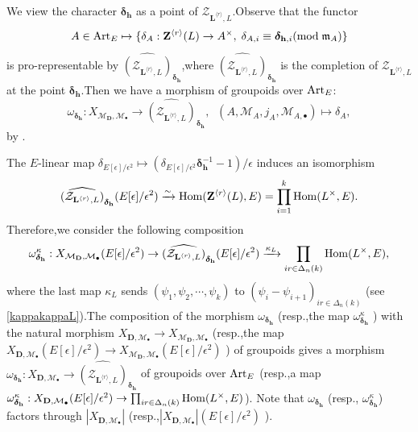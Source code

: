 \documentclass[SecEq,CM,GP]{degruyter-crelle} %
\theoremstyle{plain}
\newcommand{\Art}{{\rm Art}}
\newcommand{\Dpik}{{\mathbf{D}}}
\newcommand{\homo}{{\rm Hom}}
\newcommand{\lrr}{{\langle r\rangle}}
\newcommand{\bL}{{\mathbf{L}}}
\newcommand{\bZ}{{\mathbf{Z}}}
\newcommand{\bh}{{\mathbf{h}}}
\newcommand{\cM}{\mathcal M}
\newcommand{\cZ}{\mathcal Z}
\begin{document}
We view the character $\bm{\delta}_{\bh}$ as a point of $\cZ_{\bL^{\lrr},L}$.\;Observe that the functor
\[A\in \Art_E\mapsto \{\delta_A:\bZ^{\lrr}(L)\rightarrow A^\times,\;{\delta}_{A,i}\equiv \bm{\delta}_{\bh,i}(\mathrm{mod}\;\mathfrak{m}_A)\}\]
is pro-representable by $\widehat{(\cZ_{\bL^{\lrr},L})}_{\bm{\delta}_{\bh}}$,\;where $\widehat{(\cZ_{\bL^{\lrr},L})}_{\bm{\delta}_{\bh}}$ is the completion of $\cZ_{\bL^{\lrr},L}$ at the point $\bm{\delta}_{\bh}$.\;Then we have a morphism  of groupoids over $\Art_E$:
\begin{equation}\label{omegadeltapinon}
\omega_{\bm{\delta}_{\bh}}:X_{\cM_\Dpik,\cM_{\bullet}}\rightarrow \widehat{(\cZ_{\bL^{\lrr},L})}_{\bm{\delta}_{\bh}},\;\;(A,\cM_A,j_A,\cM_{A,\bullet})\mapsto \delta_A,
\end{equation}
by \cite[Lemma 6.2.2]{Ding2021}.\;

The $E$-linear map $\delta_{E[\epsilon]/\epsilon^2}\mapsto (\delta_{E[\epsilon]/\epsilon^2}\bm{\delta}_{\bh}^{-1}-1)/\epsilon$ induces an isomorphism $$\widehat{(\cZ_{\bL^{\lrr},L})}_{\bm{\delta}_{\bh}}(E[\epsilon]/\epsilon^2)\xrightarrow{\sim} \homo(\bZ^{\lrr}(L),E)=\prod_{i=1}^k\homo(L^\times,E).$$Therefore,\;we
consider the following composition
\begin{equation}\label{omegadeltapi}
\omega^{\kappa}_{\bm{\delta}_{\bh}}:X_{\cM_\Dpik,\cM_{\bullet}}(E[\epsilon]/\epsilon^2)\rightarrow \widehat{(\cZ_{\bL^{\lrr},L})}_{\bm{\delta}_{\bh}}(E[\epsilon]/\epsilon^2) \xrightarrow{\kappa_L}
\prod_{ir\in \Delta_n(k)}\homo(L^\times,E),
\end{equation}
where the last map $\kappa_L$ sends $(\psi_1,\psi_2,\cdots,\psi_k)$ to $(\psi_i-\psi_{i+1})_{ir\in \Delta_n(k)}$ (see \ref{kappakappaL}).\;The composition of the morphism $\omega_{\bm{\delta}_{\bh}}$ \big(resp.,\;the map $\omega^{\kappa}_{\bm{\delta}_{\bh}}$ \big) with the natural morphism  $X_{\Dpik,\cM_{\bullet}}\rightarrow X_{\cM_\Dpik,\cM_{\bullet}}$  \big(resp.,\;the map $X_{\Dpik,\cM_{\bullet}}(E[\epsilon]/\epsilon^2)\rightarrow X_{\cM_\Dpik,\cM_{\bullet}}(E[\epsilon]/\epsilon^2)$ \big) of groupoids gives a morphism
$\omega_{\bm{\delta}_{\bh}}:X_{\Dpik,\cM_{\bullet}}\rightarrow \widehat{(\cZ_{\bL^{\lrr},L})}_{\bm{\delta}_{\bh}}$ of groupoids over $\Art_E$
\big(resp.,\;a map 
$\omega^{\kappa}_{\bm{\delta}_{\bh}}:X_{\Dpik,\cM_{\bullet}}(E[\epsilon]/\epsilon^2)\rightarrow \prod_{ir\in \Delta_n(k)}\homo(L^\times,E)$\big). Note that $\omega_{\bm{\delta}_{\bh}}$ (resp.,\; $\omega^{\kappa}_{\bm{\delta}_{\bh}}$) factors through $|X_{\Dpik,\cM_{\bullet}}|$  \big(resp.,\;$|X_{\Dpik,\cM_{\bullet}}|(E[\epsilon]/\epsilon^2)$ \big).\;
\end{document}
